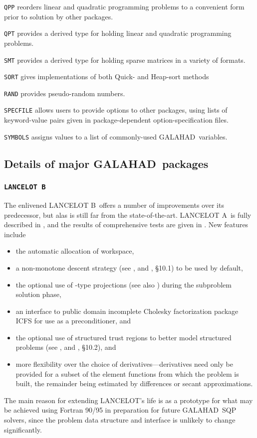 \documentclass[twoside]{article}
\newcommand{\gal}{{\sf GALAHAD}}
\newcommand{\lan}{{\sf LANCELOT}}
\newcommand{\lana}{{\sf LANCELOT A}}
\newcommand{\lanb}{{\sf LANCELOT B}}
\renewcommand{\itt}[1]{\item{{\tt #1}}}
\begin{document}
\begin{description}

\itt{QPP} reorders linear and quadratic programming
problems to a convenient form prior to solution by other packages.

\itt{QPT} provides a derived type for holding linear and quadratic programming
problems.

\itt{SMT} provides a derived type for holding sparse matrices in a variety of
formats.

\itt{SORT} gives implementations of both Quick- and Heap-sort methods

\itt{RAND} provides pseudo-random numbers.

\itt{SPECFILE} allows users to provide options to other packages, using lists
of keyword-value pairs given in package-dependent option-specification files.

\itt{SYMBOLS} assigns values to a list of commonly-used \gal\ variables.

\end{description}

\subsection{Details of major \gal\ packages\label{major}}

\subsubsection{{\tt LANCELOT B}\label{lanb}}

The enlivened \lanb\ offers a number of improvements
over its predecessor, but alas is still far from the state-of-the-art.
\lana\ is fully described in , and the results
of comprehensive tests are given in .
New features include
\begin{itemize}
\item the automatic allocation of workspace,
\item a non-monotone descent strategy (see , and
, \S10.1) to be used by default,
\item the optional use of -type projections
   (see also )
   during the subproblem solution phase,
\item an interface to  public domain incomplete Cholesky
   factorization package ICFS for use as a preconditioner, and
\item the optional use of structured trust regions to better model
   structured problems (see , and
   , \S10.2), and
\item more flexibility over the choice of derivatives---derivatives need
   only be provided for a subset of the element functions from which the
   problem is built, the remainder being estimated by differences or secant
   approximations.
\end{itemize}
The main reason for extending \lan's life is as a prototype
for what may be achieved using Fortran 90/95 in preparation for
future \gal\ SQP solvers, since the problem data structure and
interface is unlikely to change significantly.
\end{document}
